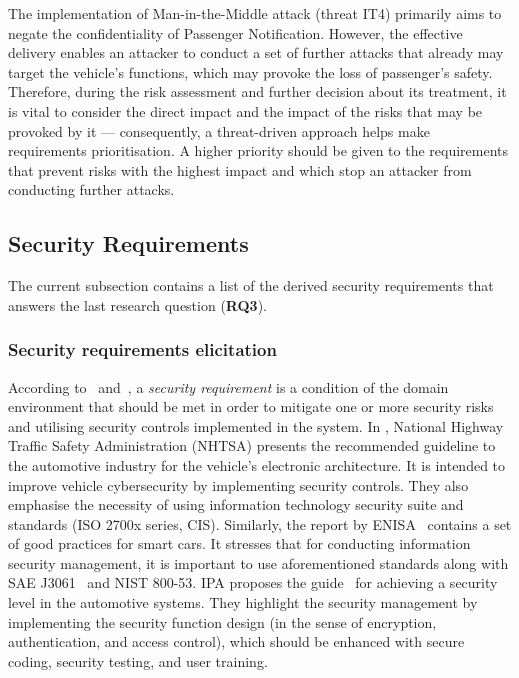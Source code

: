 \documentclass[manuscript]{acmart}
\begin{document}
The implementation of Man-in-the-Middle attack (threat IT4) primarily aims to negate the confidentiality of Passenger Notification. However, the effective delivery enables an attacker to conduct a set of further attacks that already may target the vehicle's functions, which may provoke the loss of passenger's safety. Therefore, during the risk assessment and further decision about its treatment, it is vital to consider the direct impact and the impact of the risks that may be provoked by it — consequently, a threat-driven approach helps make requirements prioritisation. A higher priority should be given to the requirements that prevent risks with the highest impact and which stop an attacker from conducting further attacks.

\subsection{Security Requirements} \label{sec:SecReqs}

The current subsection contains a list of the derived security requirements that answers the last research question (\textbf{RQ3}).

\subsubsection{Security requirements elicitation}
According to~\cite{SecReqsFiresmith} and~\cite{FundSecSysMod_RaimMat}, a \textit{security requirement} is a condition of the domain environment that should be met in order to mitigate one or more security risks and utilising security controls implemented in the system.
In \cite{NHTSA}, National Highway Traffic Safety Administration (NHTSA) presents the recommended guideline to the automotive industry for the vehicle’s electronic architecture. It is intended to improve vehicle cybersecurity by implementing security controls. They also emphasise the necessity of using information technology security suite and standards (ISO 2700x series, CIS\cite{CISControls}). Similarly, the report by ENISA~\cite{ENISA_SmartCars} contains a set of good practices for smart cars. It stresses that for conducting information security management, it is important to use aforementioned standards along with SAE J3061~\cite{sae2016j3061} and NIST 800-53\cite{nist_sp800_63b}. IPA proposes the guide~\cite{IPA_VehicleIS} for achieving a security level in the automotive systems. They highlight the security management by implementing the security function design (in the sense of encryption, authentication, and access control), which should be enhanced with secure coding, security testing, and user training.
\end{document}
